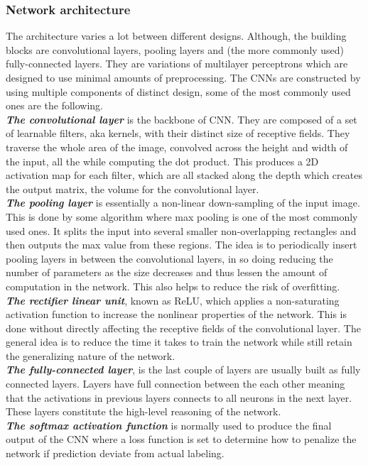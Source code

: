 \subsubsection{Network architecture}
The architecture varies a lot between different designs. Although, the building blocks are convolutional layers, pooling layers and (the more commonly used) fully-connected layers. They are variations of multilayer perceptrons which are designed to use minimal amounts of preprocessing. The CNNs are constructed by using multiple components of distinct design, some of the most commonly used ones are the following. \\

\textbf{\emph{The convolutional layer}} is the backbone of  CNN. They are composed of a set of learnable filters, aka kernels, with their distinct size of receptive fields. They traverse the whole area of the image, convolved across the height and width of the input, all the while computing the dot product. This produces a 2D activation map for each filter, which are all stacked along the depth which creates the output matrix, the volume for the convolutional layer. \\
\textbf{\emph{The pooling layer}} is essentially a non-linear down-sampling of the input image. This is done by some algorithm where max pooling is one of the most commonly used ones. It splits the input into several smaller non-overlapping rectangles and then outputs the max value from these regions. The idea is to periodically insert pooling layers in between the convolutional layers, in so doing reducing the number of parameters as the size decreases and thus lessen the amount of computation in the network. This also helps to reduce the risk of overfitting. \\
 \textbf{\emph{The rectifier linear unit}}, known as ReLU, which applies a non-saturating activation function to increase the nonlinear properties of the network. This is done without directly affecting the receptive fields of the convolutional layer. The general idea is to reduce the time it takes to train the network while still retain the generalizing nature of the network. \\
\textbf{\emph{The fully-connected layer}},  is the last couple of layers are usually built as fully connected layers. Layers have full connection between the each other meaning that the activations in previous layers connects to all neurons in the next layer. These layers constitute the high-level reasoning of the network. \\
\textbf{\emph{The softmax activation function}} is normally used to produce the final output of the CNN where a loss function is set to determine how to penalize the network if prediction deviate from actual labeling. \\

